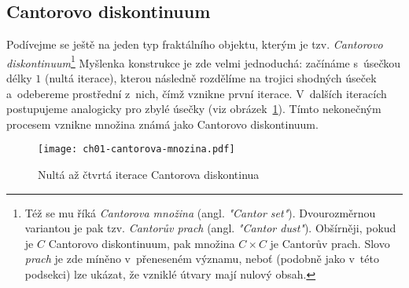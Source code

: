 \subsection{Cantorovo diskontinuum}\label{subsec:cantorovo_diskontinuum}
Podívejme se ještě na jeden typ fraktálního objektu, kterým je tzv. \emph{Cantorovo diskontinuum}\footnote{Též se mu říká \emph{Cantorova množina} (angl. \emph{"Cantor set"}). Dvourozměrnou variantou je pak tzv. \emph{Cantorův prach} (angl. \emph{"Cantor dust"}). Obšírněji, pokud je $C$ Cantorovo diskontinuum, pak množina $C\times C$ je Cantorův prach. Slovo \emph{prach} je zde míněno v~přeneseném významu, neboť (podobně jako v~této podsekci) lze ukázat, že vzniklé útvary mají nulový obsah.} Myšlenka konstrukce je zde velmi jednoduchá: začínáme s~úsečkou délky $1$ (nultá iterace), kterou následně rozdělíme na trojici shodných úseček a~odebereme prostřední z~nich, čímž vznikne první iterace. V~dalších iteracích postupujeme analogicky pro zbylé úsečky (viz obrázek~\ref{fig:cantorovo_diskontinuum}). Tímto nekonečným procesem vznikne množina známá jako Cantorovo diskontinuum.
\begin{figure}[h]
    \centering
    \texttt{[image: ch01-cantorova-mnozina.pdf]}
    \caption{Nultá až čtvrtá iterace Cantorova diskontinua}
    \label{fig:cantorovo_diskontinuum}
\end{figure}

